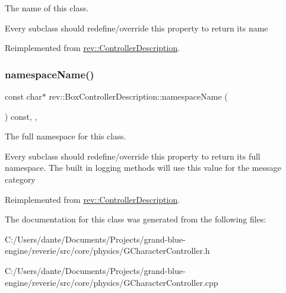 The name of this class. 

Every subclass should redefine/override this property to return its name 

Reimplemented from \mbox{\hyperlink{classrev_1_1_controller_description_a8170f2acabf587228bae29aba6c1a90b}{rev\+::\+Controller\+Description}}.

\mbox{\label{classrev_1_1_box_controller_description_adb539380f3f2033d6d6fbfe1b36a69c8}} 
\subsubsection{\texorpdfstring{namespaceName()}{namespaceName()}}
{\footnotesize\ttfamily const char$\ast$ rev\+::\+Box\+Controller\+Description\+::namespace\+Name (\begin{DoxyParamCaption}{ }\end{DoxyParamCaption}) const\hspace{0.3cm}{\ttfamily [inline]}, {\ttfamily [override]}, {\ttfamily [virtual]}}



The full namespace for this class. 

Every subclass should redefine/override this property to return its full namespace. The built in logging methods will use this value for the message category 

Reimplemented from \mbox{\hyperlink{classrev_1_1_controller_description_a95ae000783dd5460060582a129c9251d}{rev\+::\+Controller\+Description}}.



The documentation for this class was generated from the following files\+:\begin{DoxyCompactItemize}
\item 
C\+:/\+Users/dante/\+Documents/\+Projects/grand-\/blue-\/engine/reverie/src/core/physics/G\+Character\+Controller.\+h\item 
C\+:/\+Users/dante/\+Documents/\+Projects/grand-\/blue-\/engine/reverie/src/core/physics/G\+Character\+Controller.\+cpp\end{DoxyCompactItemize}
